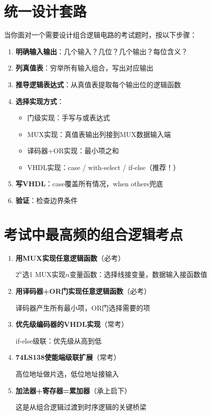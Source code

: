 \section{统一设计套路}

当你面对一个需要设计组合逻辑电路的考试题时，按以下步骤：

\begin{designflow}[组合逻辑电路统一设计流程]
\begin{enumerate}
  \item \textbf{明确输入输出}：几个输入？几位？几个输出？每位含义？
  \item \textbf{列真值表}：穷举所有输入组合，写出对应输出
  \item \textbf{推导逻辑表达式}：从真值表提取每个输出位的逻辑函数
  \item \textbf{选择实现方式}：
  \begin{itemize}
    \item 门级实现：手写与或表达式
    \item MUX实现：真值表输出列接到MUX数据输入端
    \item 译码器+OR实现：最小项之和
    \item VHDL实现：case / with-select / if-else（推荐！）
  \end{itemize}
  \item \textbf{写VHDL}：case覆盖所有情况，when others兜底
  \item \textbf{验证}：检查边界条件
\end{enumerate}
\end{designflow}

\section{考试中最高频的组合逻辑考点}

\begin{enumerate}
  \item \textbf{用MUX实现任意逻辑函数}（必考）

  $2^n$选1 MUX实现$n$变量函数：选择线接变量，数据输入接函数值

  \item \textbf{用译码器+OR门实现任意逻辑函数}（必考）

  译码器产生所有最小项，OR门选择需要的项

  \item \textbf{优先级编码器的VHDL实现}（常考）

  if-else级联：优先级从高到低

  \item \textbf{74LS138使能端级联扩展}（常考）

  高位地址做片选，低位地址接输入

  \item \textbf{加法器+寄存器=累加器}（承上启下）

  这是从组合逻辑过渡到时序逻辑的关键桥梁
\end{enumerate}


